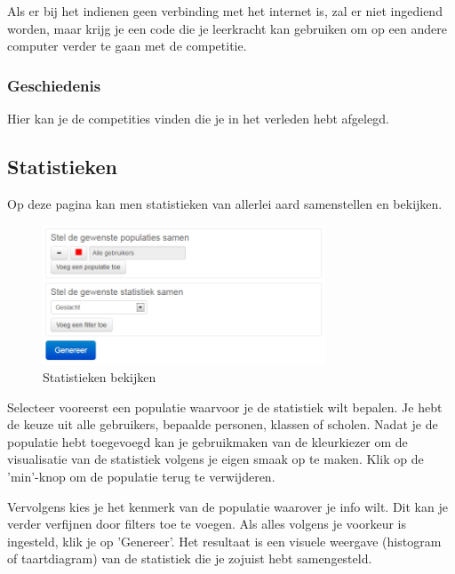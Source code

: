 \documentclass[]{article}
\begin{document}
Als er bij het indienen geen verbinding met het internet is, zal er niet ingediend worden, maar krijg je een code die je leerkracht kan gebruiken om op een andere computer verder te gaan met de competitie.

\subsubsection{Geschiedenis}

Hier kan je de competities vinden die je in het verleden hebt afgelegd.

\subsection{Statistieken}

Op deze pagina kan men statistieken van allerlei aard samenstellen en bekijken. 

\begin{figure}[!ht]
	\centering
	\includegraphics[width=0.75\textwidth]{img/stats}
	\caption{Statistieken bekijken}
	\label{stats}
\end{figure}

Selecteer vooreerst een populatie waarvoor je de statistiek wilt bepalen. Je hebt de keuze uit alle gebruikers, bepaalde personen, klassen of scholen. Nadat je de populatie hebt toegevoegd kan je gebruikmaken van de kleurkiezer om de visualisatie van de statistiek volgens je eigen smaak op te maken. Klik op de 'min'-knop om de populatie terug te verwijderen.

Vervolgens kies je het kenmerk van de populatie waarover je info wilt. Dit kan je verder verfijnen door filters toe te voegen. Als alles volgens je voorkeur is ingesteld, klik je op 'Genereer'. Het resultaat is een visuele weergave (histogram of taartdiagram) van de statistiek die je zojuist hebt samengesteld.
\end{document}
